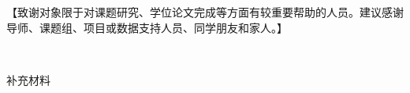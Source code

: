 \documentclass{caugradthesis}
\begin{document}
\startmainbody









\begin{acknowledgements}
【致谢对象限于对课题研究、学位论文完成等方面有较重要帮助的人员。建议感谢导师、课题组、项目或数据支持人员、同学朋友和家人。】

\begin{flushright}
  \textit{\thethesisauthor} \\
  \thethesisdate
\end{flushright}
\end{acknowledgements}

\begin{appendixsection}{补充材料}

\end{appendixsection}

\begin{authorinfo}

\end{authorinfo}
\end{document}

